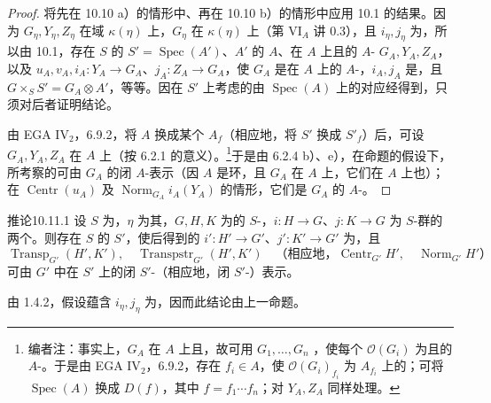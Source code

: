 \begin{proof}
将先在 10.10 a）的情形中、再在 10.10 b）的情形中应用 10.1 的结果。因为 $G_\eta,Y_\eta,Z_\eta$ 在域 $\kappa(\eta)$ 上，$G_\eta$ 在 $\kappa(\eta)$ 上（第 VI$_A$ 讲 0.3），且 $i_\eta,j_\eta$ 为，所以由 10.1，存在 $S$ 的 $S'=\operatorname{Spec}(A')$、$A'$ 的 $A$、在 $A$ 上且的 $A$- $G_A,Y_A,Z_A$，以及 $u_A,v_A,i_A:Y_A\to G_A$、$j_A:Z_A\to G_A$，使 $G_A$ 是在 $A$ 上的 $A$-，$i_A,j_A$ 是，且 $G\times_S S'=G_A\otimes A'$，等等。因在 $S'$ 上考虑的由 $\operatorname{Spec}(A)$ 上的对应经得到，只须对后者证明结论。

由 EGA IV$_2$，6.9.2，将 $A$ 换成某个 $A_f$（相应地，将 $S'$ 换成 $S'_f$）后，可设 $G_A,Y_A,Z_A$ 在 $A$ 上（按 6.2.1 的意义）。\footnote{编者注：事实上，$G_A$ 在 $A$ 上且，故可用 $G_1,\ldots,G_n$ ，使每个 $\mathcal O(G_i)$ 为且的 $A$-。于是由 EGA IV$_2$，6.9.2，存在 $f_i\in A$，使 $\mathcal O(G_i)_{f_i}$ 为 $A_{f_i}$ 上的；可将 $\operatorname{Spec}(A)$ 换成 $D(f)$，其中 $f=f_1\cdots f_n$；对 $Y_A,Z_A$ 同样处理。}于是由 6.2.4 b）、e），在命题的假设下，所考察的可由 $G_A$ 的闭 $A$-表示（因 $A$ 是环，且 $G_A$ 在 $A$ 上，它们在 $A$ 上也）；
在 $\operatorname{Centr}(u_A)$ 及 $\operatorname{Norm}_{G_A}i_A(Y_A)$ 的情形，它们是 $G_A$ 的 $A$-。
\end{proof}

\begin{SGAresult}{推论}{10.11.1}
设 $S$ 为，$\eta$ 为其，$G,H,K$ 为的 $S$-，$i:H\to G$、$j:K\to G$ 为 $S$-群的两个。则存在 $S$ 的 $S'$，使后得到的 $i':H'\to G'$、$j':K'\to G'$ 为，且
\[
\operatorname{Transp}_{G'}(H',K'),\quad\operatorname{Transpstr}_{G'}(H',K')
\quad\text{（相应地，}\operatorname{Centr}_{G'}H',\quad\operatorname{Norm}_{G'}H'\text{）}
\]
可由 $G'$ 中在 $S'$ 上的闭 $S'$-（相应地，闭 $S'$-）表示。
\end{SGAresult}
由 1.4.2，假设蕴含 $i_\eta,j_\eta$ 为，因而此结论由上一命题。

